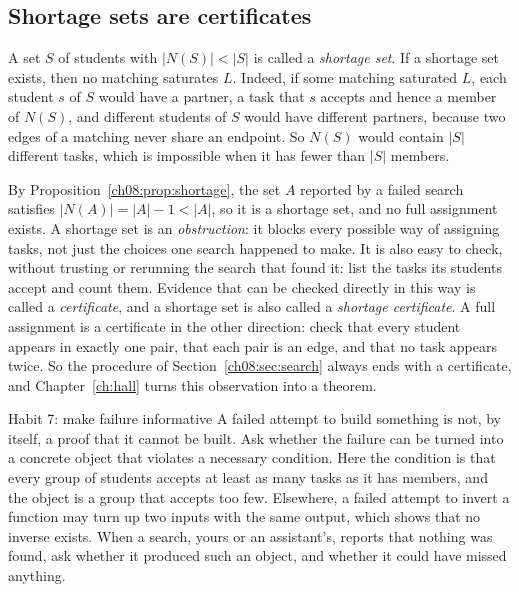 \subsection*{Shortage sets are certificates}
A set $S$ of students with $|N(S)|<|S|$ is called a \emph{shortage set}. If a shortage set exists, then no matching saturates $L$. Indeed, if some matching saturated $L$, each student $s$ of $S$ would have a partner, a task that $s$ accepts and hence a member of $N(S)$, and different students of $S$ would have different partners, because two edges of a matching never share an endpoint. So $N(S)$ would contain $|S|$ different tasks, which is impossible when it has fewer than $|S|$ members.

By Proposition~\ref{ch08:prop:shortage}, the set $A$ reported by a failed search satisfies $|N(A)|=|A|-1<|A|$, so it is a shortage set, and no full assignment exists. A shortage set is an \emph{obstruction}: it blocks every possible way of assigning tasks, not just the choices one search happened to make. It is also easy to check, without trusting or rerunning the search that found it: list the tasks its students accept and count them. Evidence that can be checked directly in this way is called a \emph{certificate}, and a shortage set is also called a \emph{shortage certificate}. A full assignment is a certificate in the other direction: check that every student appears in exactly one pair, that each pair is an edge, and that no task appears twice. So the procedure of Section~\ref{ch08:sec:search} always ends with a certificate, and Chapter~\ref{ch:hall} turns this observation into a theorem.

\begin{principle}{Habit 7: make failure informative}
A failed attempt to build something is not, by itself, a proof that it cannot be built. Ask whether the failure can be turned into a concrete object that violates a necessary condition. Here the condition is that every group of students accepts at least as many tasks as it has members, and the object is a group that accepts too few. Elsewhere, a failed attempt to invert a function may turn up two inputs with the same output, which shows that no inverse exists. When a search, yours or an assistant's, reports that nothing was found, ask whether it produced such an object, and whether it could have missed anything.
\end{principle}
